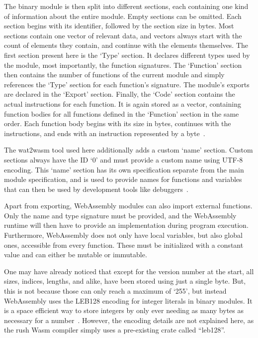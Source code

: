 The binary module is then split into different sections, each containing one kind of information about the entire module.
Empty sections can be omitted.
Each section begins with its identifier, followed by the section size in bytes.
Most sections contain one vector of relevant data, and vectors always start with the count of elements they contain, and continue with the elements themselves.
The first section present here is the `Type' section.
It declares different types used by the module, most importantly, the function signatures.
The `Function' section then contains the number of functions of the current module and simply references the `Type' section for each function's signature.
The module's exports are declared in the `Export' section.
Finally, the `Code' section contains the actual instructions for each function.
It is again stored as a vector, containing function bodies for all functions defined in the `Function' section in the same order.
Each function body begins with its size in bytes, continues with the instructions, and ends with an  instruction represented by a  byte~\cite[Sections~5.5,5.1.3,5.4.9]{WasmSpec}.

The wat2wasm tool used here additionally adds a custom `name' section.
Custom sections always have the ID `0' and must provide a custom name using UTF-8 encoding.
This `name' section has its own specification separate from the main module specification, and is used to provide names for functions and variables that can then be used by development tools like debuggers~\cite[Section~7.4.1]{WasmSpec}.

Apart from exporting, WebAssembly modules can also import external functions.
Only the name and type signature must be provided, and the WebAssembly runtime will then have to provide an implementation during program execution.
Furthermore, WebAssembly does not only have local variables, but also global ones, accessible from every function.
These must be initialized with a constant value and can either be mutable or immutable.

One may have already noticed that except for the version number at the start, all sizes, indices, lengths, and alike, have been stored using just a single byte.
But, this is not because those can only reach a maximum of `255', but instead WebAssembly uses the LEB128 encoding for integer literals in binary modules.
It is a space efficient way to store integers by only ever needing as many bytes as necessary for a number~\cite[Section~5.2.2]{WasmSpec}.
However, the encoding details are not explained here, as the rush Wasm compiler simply uses a pre-existing crate called \enquote{leb128}.

